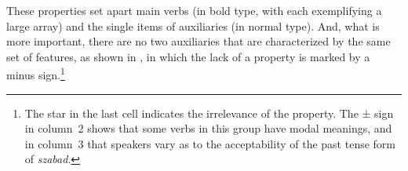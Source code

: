 \documentclass[output=paper]{langsci/langscibook}
\begin{document}
\ea\label{ex:27.12} 
    \z
\z

These properties set apart main verbs (in bold type, with each exemplifying a
large array) and the single items of auxiliaries (in normal type). And, what is
more important, there are no two auxiliaries that are characterized by the same
set of features, as shown in , in which the lack of a
property is marked by a minus sign.\footnote{The star in the last cell
    indicates the irrelevance of the property. The ± sign in column~2 shows that
    some verbs in this group have modal meanings, and in column~3 that speakers
    vary as to the acceptability of the past tense form of \emph{szabad}.}
\end{document}
